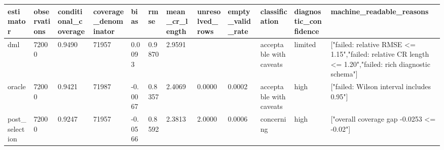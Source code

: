 \begin{tabular}{llllllllllll}
\hline
estimator & observations & conditional\_coverage & coverage\_denominator & bias & rmse & mean\_cr\_length & unresolved\_rows & empty\_valid\_rate & classification & diagnostic\_confidence & machine\_readable\_reasons \\
\hline
dml & 72000 & 0.9490 & 71957 & 0.0093 & 0.9870 & 2.9591 &  &  & acceptable with caveats & limited & ["failed: relative RMSE <= 1.15","failed: relative CR length <= 1.20","failed: rich diagnostic schema"] \\
oracle & 72000 & 0.9421 & 71987 & -0.0067 & 0.8357 & 2.4069 & 0.0000 & 0.0002 & acceptable with caveats & high & ["failed: Wilson interval includes 0.95"] \\
post\_selection & 72000 & 0.9247 & 71957 & -0.0566 & 0.8592 & 2.3813 & 2.0000 & 0.0006 & concerning & high & ["overall coverage gap -0.0253 <= -0.02"] \\
\hline
\end{tabular}
